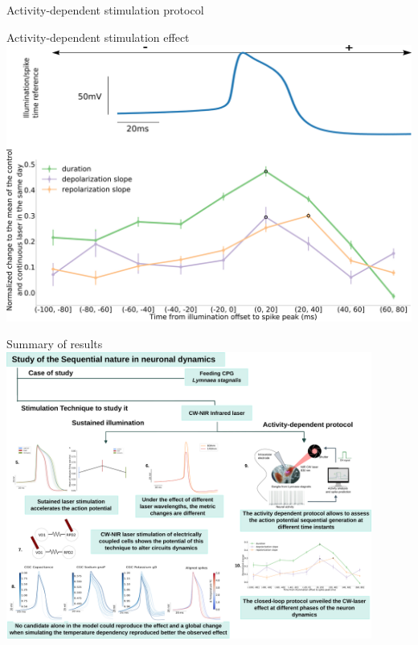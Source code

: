 \documentclass[aspectratio=43]{beamer}
\begin{document}
\begin{frame}{Activity-dependent stimulation protocol}
{	}
\end{frame}

\begin{frame}{Activity-dependent stimulation effect}
	\centering
	\includegraphics[width=\textwidth]{Images/activity-dependent results.png}
\end{frame}

\begin{frame}{Summary of results}
	\centering
	\includegraphics[width=0.9\textwidth]{Images/laser_summary.png}
\end{frame}
\end{document}
